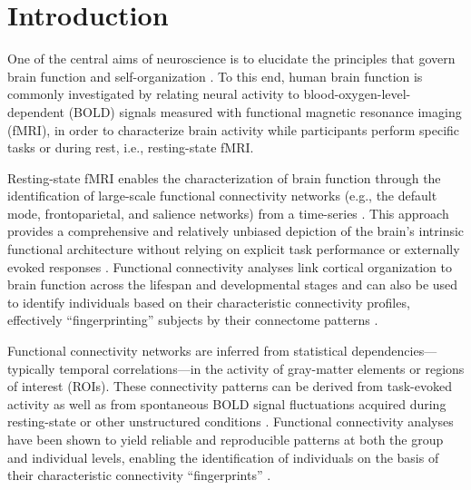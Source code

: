 \section{Introduction}
\label{sec:introRS} 


    
One of the central aims of neuroscience is to elucidate the principles that govern brain function and self-organization \citep{finnFunctionalNeuroimagingCatalyst2023}. To this end, human brain function is commonly investigated by relating neural activity to blood-oxygen-level-dependent (BOLD) signals measured with functional magnetic resonance imaging (fMRI), in order to characterize brain activity while participants perform specific tasks or during rest, i.e., resting-state fMRI.

Resting-state fMRI enables the characterization of brain function through the identification of large-scale functional connectivity networks (e.g., the default mode, frontoparietal, and salience networks) from a time-series \citep{vincentEvidenceFrontoparietalControl2008,menonSaliencySwitchingAttention2010}. This approach provides a comprehensive and relatively unbiased depiction of the brain’s intrinsic functional architecture without relying on explicit task performance or externally evoked responses \citep{foxSpontaneousFluctuationsBrain2007}. Functional connectivity analyses link cortical organization to brain function across the lifespan and developmental stages \citep{taylorFunctionalHierarchyHuman2026} and can also be used to identify individuals based on their characteristic connectivity profiles, effectively “fingerprinting” subjects by their connectome patterns \citep{finnFunctionalConnectomeFingerprinting2015}.

Functional connectivity networks are inferred from statistical dependencies—typically temporal correlations—in the activity of gray-matter elements or regions of interest (ROIs). These connectivity patterns can be derived from task-evoked activity as well as from spontaneous BOLD signal fluctuations acquired during resting-state or other unstructured conditions \citep{bastosTutorialReviewFunctional2016}. Functional connectivity analyses have been shown to yield reliable and reproducible patterns at both the group and individual levels, enabling the identification of individuals on the basis of their characteristic connectivity “fingerprints” \citep{grattonFunctionalBrainNetworks2018a, finnFunctionalConnectomeFingerprinting2015, seitzmanTraitlikeVariantsHuman2019}.

